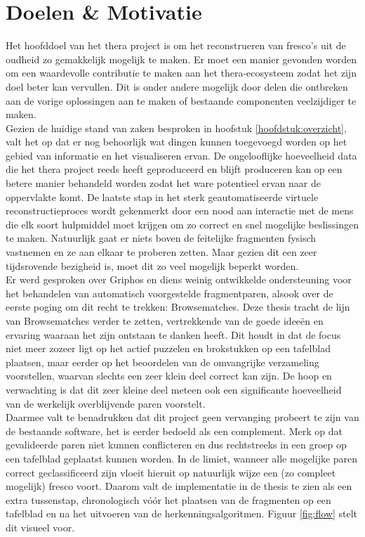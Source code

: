 \chapter{Doelen \& Motivatie}
\label{hoofdstuk:doelen}

Het hoofddoel van het thera project is om het reconstrueren van fresco's uit de oudheid zo gemakkelijk mogelijk te maken. Er moet een manier gevonden worden om een waardevolle contributie te maken aan het thera-ecosysteem zodat het zijn doel beter kan vervullen. Dit is onder andere mogelijk door delen die ontbreken aan de vorige oplossingen aan te maken of bestaande componenten veelzijdiger te maken.\\

Gezien de huidige stand van zaken besproken in hoofstuk \ref{hoofdstuk:overzicht}, valt het op dat er nog behoorlijk wat dingen kunnen toegevoegd worden op het gebied van informatie en het visualiseren ervan. De ongelooflijke hoeveelheid data die het thera project reeds heeft geproduceerd en blijft produceren kan op een betere manier behandeld worden zodat het ware potentieel ervan naar de oppervlakte komt. De laatste stap in het sterk geautomatiseerde virtuele reconstructieproces wordt gekenmerkt door een nood aan interactie met de mens die elk soort hulpmiddel moet krijgen om zo correct en snel mogelijke beslissingen te maken. Natuurlijk gaat er niets boven de feitelijke fragmenten fysisch vastnemen en ze aan elkaar te proberen zetten. Maar gezien dit een zeer tijdsrovende bezigheid is, moet dit zo veel mogelijk beperkt worden.\\

Er werd gesproken over Griphos en diens weinig ontwikkelde ondersteuning voor het behandelen van automatisch voorgestelde fragmentparen, alsook over de eerste poging om dit recht te trekken: Browsematches. Deze thesis tracht de lijn van Browsematches verder te zetten, vertrekkende van de goede idee\"en en ervaring waaraan het zijn ontstaan te danken heeft. Dit houdt in dat de focus niet meer zozeer ligt op het actief puzzelen en brokstukken op een tafelblad plaatsen, maar eerder op het beoordelen van de omvangrijke verzameling voorstellen, waarvan slechts een zeer klein deel correct kan zijn. De hoop en verwachting is dat dit zeer kleine deel meteen ook een significante hoeveelheid van de werkelijk overblijvende paren voorstelt.\\

Daarmee valt te benadrukken dat dit project geen vervanging probeert te zijn van de bestaande software, het is eerder bedoeld als een complement. Merk op dat gevalideerde paren niet kunnen conflicteren en dus rechtstreeks in een groep op een tafelblad geplaatst kunnen worden. In de limiet, wanneer alle mogelijke paren correct geclassificeerd zijn vloeit hieruit op natuurlijk wijze een (zo compleet mogelijk) fresco voort. Daarom valt de implementatie in de thesis te zien als een extra tussenstap, chronologisch v\'o\'or het plaatsen van de fragmenten op een tafelblad en na het uitvoeren van de herkenningsalgoritmen. Figuur \ref{fig:flow} stelt dit visueel voor.

